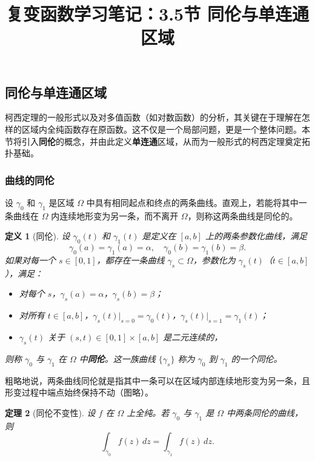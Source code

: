 \documentclass[UTF8]{ctexart}
\title{复变函数学习笔记：3.5节 同伦与单连通区域}
\author{}
\date{}
\newtheorem{theorem}{定理}[section]
\newtheorem{definition}[theorem]{定义}
\numberwithin{equation}{section}
\begin{document}
\maketitle

\setcounter{section}{3}
\setcounter{subsection}{4}
\subsection{同伦与单连通区域}

柯西定理的一般形式以及对多值函数（如对数函数）的分析，其关键在于理解在怎样的区域内全纯函数存在原函数。这不仅是一个局部问题，更是一个整体问题。本节将引入\textbf{同伦}的概念，并由此定义\textbf{单连通}区域，从而为一般形式的柯西定理奠定拓扑基础。

\subsubsection{曲线的同伦}

设 $\gamma_0$ 和 $\gamma_1$ 是区域 $\Omega$ 中具有相同起点和终点的两条曲线。直观上，若能将其中一条曲线在 $\Omega$ 内连续地形变为另一条，而不离开 $\Omega$，则称这两条曲线是同伦的。

\begin{definition}[同伦]
设 $\gamma_0(t)$ 和 $\gamma_1(t)$ 是定义在 $[a,b]$ 上的两条参数化曲线，满足
\[
\gamma_0(a)=\gamma_1(a)=\alpha,\quad \gamma_0(b)=\gamma_1(b)=\beta .
\]
如果对每一个 $s\in[0,1]$，都存在一条曲线 $\gamma_s\subset\Omega$，参数化为 $\gamma_s(t)$（$t\in[a,b]$），满足：
\begin{itemize}
    \item 对每个 $s$，$\gamma_s(a)=\alpha$，$\gamma_s(b)=\beta$；
    \item 对所有 $t\in[a,b]$，$\gamma_s(t)|_{s=0}=\gamma_0(t)$，$\gamma_s(t)|_{s=1}=\gamma_1(t)$；
    \item $\gamma_s(t)$ 关于 $(s,t)\in[0,1]\times[a,b]$ 是二元连续的，
\end{itemize}
则称 $\gamma_0$ 与 $\gamma_1$ 在 $\Omega$ 中\textbf{同伦}。这一族曲线 $\{\gamma_s\}$ 称为 $\gamma_0$ 到 $\gamma_1$ 的一个同伦。
\end{definition}

粗略地说，两条曲线同伦就是指其中一条可以在区域内部连续地形变为另一条，且形变过程中端点始终保持不动（图略）。

\begin{theorem}[同伦不变性]
设 $f$ 在 $\Omega$ 上全纯。若 $\gamma_0$ 与 $\gamma_1$ 是 $\Omega$ 中两条同伦的曲线，则
\[
\int_{\gamma_0} f(z)\,dz = \int_{\gamma_1} f(z)\,dz .
\]
\end{theorem}
\end{document}
